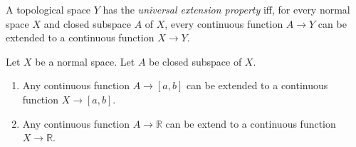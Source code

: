 \begin{df}
 A topological space $Y$ has the \emph{universal extension property} iff, for
every normal space $X$ and closed subspace $A$ of $X$, every continuous
function $A
\rightarrow Y$ can be extended to a continuous function $X \rightarrow Y$.
\end{df}

\begin{thm}
Let $X$ be a normal space. Let $A$ be closed subspace of $X$.
\begin{enumerate}
 \item Any continuous function $A \rightarrow [a,b]$ can be extended to a
continuous function $X \rightarrow [a,b]$.
\item Any continuous function $A \rightarrow \mathbb{R}$ can be extend to a
continuous function $X \rightarrow \mathbb{R}$.
\end{enumerate}
\end{thm}

